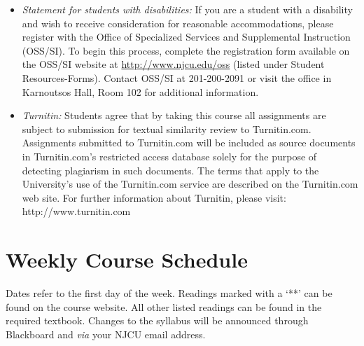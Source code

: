 \documentclass[article,oneside]{memoir}
\begin{document}
\begin{itemize}
\item \textit{Statement for students with disabilities:} If you are a student
with a disability and wish to receive consideration for reasonable
accommodations, please register with the Office of Specialized Services
and Supplemental Instruction (OSS/SI). To begin this process, complete
the registration form available on the OSS/SI website at
\href{http://www.njcu.edu/oss}{http://www.njcu.edu/oss}
(listed under Student Resources-Forms). Contact OSS/SI at 201-200-2091
or visit the office in Karnoutsos Hall, Room 102 for additional
information.

\item \textit{Turnitin:} Students agree that by taking this course all assignments are subject to submission for textual similarity review to Turnitin.com. Assignments submitted to Turnitin.com will be included as source documents in Turnitin.com's restricted access database solely for the purpose of detecting plagiarism in such documents.  The terms that apply to the University’s use of the Turnitin.com service are described on the Turnitin.com web site.  For further information about Turnitin, please visit: http://www.turnitin.com 


\end{itemize}



\section{Weekly Course Schedule}
Dates refer to the first day of the week. Readings marked with a `**' can be found on the course website. All other listed readings can be found in the required textbook. Changes to the syllabus will be announced through Blackboard and \emph{via} your NJCU email address.
\end{document}

